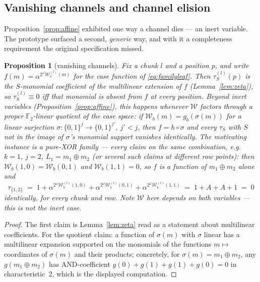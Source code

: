 \documentclass[11pt]{article}
\newcommand{\F}{\mathbb{F}}
\newcommand{\Ftwo}{\F_2}
\newcommand{\bits}{\{0,1\}}
\newcommand{\Wc}{\mathcal{W}}          %
\theoremstyle{plain}
\newtheorem{proposition}[theorem]{Proposition}
\theoremstyle{definition}
\theoremstyle{remark}
\begin{document}
\subsection{Vanishing channels and channel elision}\label{sec:vanish}

Proposition~\ref{prop:affine} exhibited one way a channel dies --- an inert
variable. The prototype surfaced a second, \emph{generic} way, and with it a
completeness requirement the original specification missed.

\begin{proposition}[vanishing channels]\label{prop:vanish}
Fix a chunk $l$ and a position $p$, and write
$f(m)=\alpha^{2^{\omega}\Wc^{(l)}_b(m)}$ for the case function of
\eqref{eq:familyleaf}. Then $\tau^{(l)}_S(p)$ is the $S$-monomial
coefficient of the multilinear extension of $f$ (Lemma~\ref{lem:zeta}), so
$\tau^{(l)}_S \equiv 0$ iff that monomial is absent from $f$ at every
position. Beyond inert variables (Proposition~\ref{prop:affine}), this
happens whenever $\Wc$ \emph{factors through a proper $\Ftwo$-linear
quotient} of the case space: if $\Wc_b(m) = g_b(\sigma(m))$ for a linear
surjection $\sigma:\bits^{j}\to\bits^{j'}$, $j'<j$, then $f = h\circ\sigma$
and every $\tau_S$ with $S$ not in the image of $\sigma$'s monomial
support vanishes identically. The motivating instance is a
\emph{pure-XOR family} --- every claim on the same combination, e.g.\
$k=1$, $j=2$, $L_1=m_1\oplus m_2$ (or several such claims at different row
points): then $\Wc_b(1,0)=\Wc_b(0,1)$ and $\Wc_b(1,1)=0$, so
$f$ is a function of $m_1\oplus m_2$ alone and
\[
  \tau_{\{1,2\}} \;=\; 1 + \alpha^{2^{\omega}\Wc^{(l)}_b(1,0)}
                        + \alpha^{2^{\omega}\Wc^{(l)}_b(0,1)}
                        + \alpha^{2^{\omega}\Wc^{(l)}_b(1,1)}
  \;=\; 1 + A + A + 1 \;=\; 0
\]
identically, for every chunk and row. Note $\Wc$ here depends on
\emph{both} variables --- this is not the inert case.
\end{proposition}

\begin{proof}
The first claim is Lemma~\ref{lem:zeta} read as a statement about
multilinear coefficients. For the quotient claim: a function of
$\sigma(m)$ with $\sigma$ linear has a multilinear expansion supported on
the monomials of the functions $m\mapsto$ coordinates of $\sigma(m)$ and
their products; concretely, for $\sigma(m)=m_1\oplus m_2$, any
$g(m_1\oplus m_2)$ has AND-coefficient
$g(0)+g(1)+g(1)+g(0)=0$ in characteristic~2, which is the displayed
computation.
\end{proof}
\end{document}
